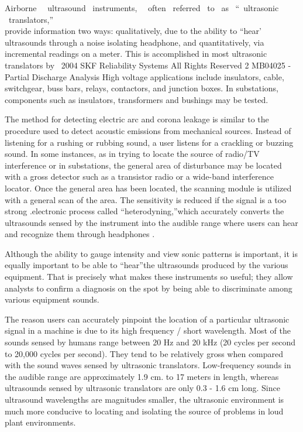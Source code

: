 Airborne ~~ultrasound ~instruments, ~~often ~referred ~to ~as ~\textquotedblleft ~ultrasonic ~translators,\textquotedblright\\provide information two ways: qualitatively, due to the ability to \textquotedblleft hear' ultrasounds through a noise isolating headphone, and quantitatively, via incremental readings on a meter. This is accomplished in most ultrasonic translators by \textcopyright~2004 SKF Reliability Systems All Rights Reserved 2 MB04025 - Partial Discharge Analysis High voltage applications include insulators, cable, switchgear, buss bars, relays, contactors, and junction boxes. In substations, components such as insulators, transformers and bushings may be tested.

The method for detecting electric arc and corona leakage is similar to the procedure used to detect acoustic emissions from mechanical sources. Instead of listening for a rushing or rubbing sound, a user listens for a crackling or buzzing sound. In some instances, as in trying to locate the source of radio/TV interference or in substations, the general area of disturbance may be located with a gross detector such as a transistor radio or a wide-band interference locator. Once the general area has been located, the scanning module is utilized with a general scan of the area. The sensitivity is reduced if the signal is a too strong .electronic process called \textquotedblleft heterodyning,\textquotedblright which accurately converts the ultrasounds sensed by the instrument into the audible range where users can hear and recognize them through headphones \cite{sokolov1995experience}.

Although the ability to gauge intensity and view sonic patterns is important, it is equally important to be able to \textquotedblleft hear\textquotedblright the ultrasounds produced by the various equipment. That is precisely what makes these instruments so useful; they allow analysts to confirm a diagnosis on the spot by being able to discriminate among various equipment sounds.

The reason users can accurately pinpoint the location of a particular ultrasonic signal in a machine is due to its high frequency / short wavelength. Most of the sounds sensed by humans range between 20 Hz and 20 kHz (20 cycles per second to 20,000 cycles per second). They tend to be relatively gross when compared with the sound waves sensed by ultrasonic translators. Low-frequency sounds in the audible range are approximately 1.9 cm. to 17 meters in length, whereas ultrasounds sensed by ultrasonic translators are only 0.3 - 1.6 cm long. Since ultrasound wavelengths are magnitudes smaller, the ultrasonic environment is much more conducive to locating and isolating the source of problems in loud plant environments\setlength{\parskip}{0em}.

